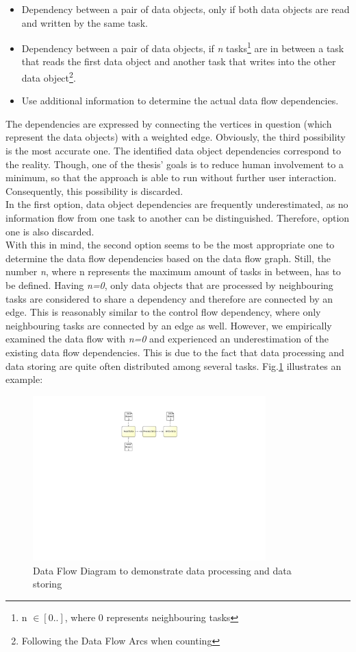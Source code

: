 \begin{itemize}
	\item Dependency between a pair of data objects, only if both data objects are read and written by the same task.
	\item Dependency between a pair of data objects, if \textit{n} tasks\footnote{n $\in [0..]$, where 0 represents neighbouring tasks} are in between a task that reads the first data object and another task that writes into the other data object\footnote{Following the Data Flow Arcs when counting}.

	\item Use additional information to determine the actual data flow dependencies.
\end{itemize}
\noindent
The dependencies are expressed by connecting the vertices in question (which represent the data objects) with a weighted edge. 
Obviously, the third possibility is the most accurate one. The identified data object dependencies correspond to the reality. Though, one of the thesis' goals is to reduce human involvement to a minimum, so that the approach is able to run without further user interaction. Consequently, this possibility is discarded. \\
In the first option, data object dependencies are frequently underestimated, as no information flow from one task to another can be distinguished. Therefore, option one is also discarded. \\
With this in mind, the second option seems to be the most appropriate one to determine the data flow dependencies based on the data flow graph. Still, the number \textit{n}, where n represents the maximum amount of tasks in between, has to be defined. Having \textit{n=0}, only data objects that are processed by neighbouring tasks are considered to share a dependency and therefore are connected by an edge. This is reasonably similar to the control flow dependency, where only neighbouring tasks are connected by an edge as well. However, we empirically examined the data flow with \textit{n=0} and experienced an underestimation of the existing data flow dependencies. This is due to the fact that data processing and data storing are quite often distributed among several tasks. Fig.\ref{fig:ExampleDataProcessing} illustrates an example: 


\begin{figure}[h!]
	\centering
	\includegraphics[width=9cm, trim={10cm 14.3cm 10cm 2.2cm}]{img/ProcessDataDFD.pdf}
	\caption{Data Flow Diagram to demonstrate data processing and data storing}
	\label{fig:ExampleDataProcessing}
\end{figure}

